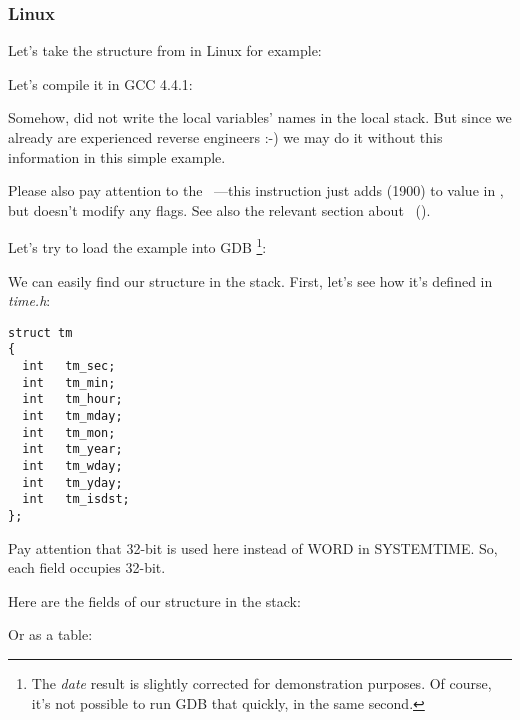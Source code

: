 ﻿\subsubsection{Linux}

Let's take the  structure from  in Linux for example:



Let's compile it in GCC 4.4.1:



Somehow, \IDA did not write the local variables' names in the local stack.
But since we already are experienced reverse engineers :-) we may do it without this information in 
this simple example.


Please also pay attention to the ~---this instruction just adds  (1900) to value in \EAX,
but doesn't modify any flags. See also the relevant section about \LEA{}~().


Let's try to load the example into GDB
\footnote{The \emph{date} result is slightly corrected for demonstration purposes.
Of course, it's not possible to run GDB that quickly, in the same second.}:



We can easily find our structure in the stack.
First, let's see how it's defined in \emph{time.h}:

\begin{lstlisting}[caption=time.h, label=struct_tm,style=customc]
struct tm
{
  int	tm_sec;
  int	tm_min;
  int	tm_hour;
  int	tm_mday;
  int	tm_mon;
  int	tm_year;
  int	tm_wday;
  int	tm_yday;
  int	tm_isdst;
};
\end{lstlisting}

Pay attention that
32-bit \Tint is used here instead of WORD in SYSTEMTIME.
So, each field occupies 32-bit.

Here are the fields of our structure in the stack:



Or as a table:

